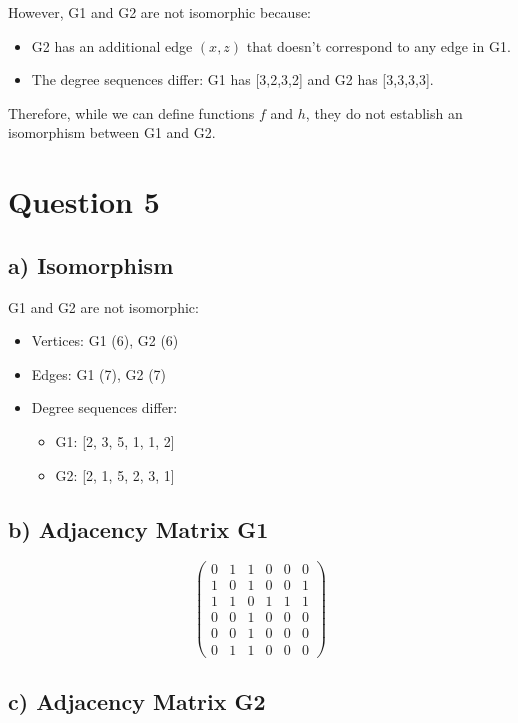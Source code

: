 \documentclass{article}
\begin{document}
However, G1 and G2 are not isomorphic because:
\begin{itemize}
\item G2 has an additional edge $(x,z)$ that doesn't correspond to any edge in G1.
\item The degree sequences differ: G1 has [3,2,3,2] and G2 has [3,3,3,3].
\end{itemize}

Therefore, while we can define functions $f$ and $h$, they do not establish an isomorphism between G1 and G2.

\section*{Question 5}

\subsection*{a) Isomorphism}

G1 and G2 are not isomorphic:
\begin{itemize}
  \item Vertices: G1 (6), G2 (6)
  \item Edges: G1 (7), G2 (7)
  \item Degree sequences differ:
    \begin{itemize}
      \item G1: [2, 3, 5, 1, 1, 2]
      \item G2: [2, 1, 5, 2, 3, 1]
    \end{itemize}
\end{itemize}

\subsection*{b) Adjacency Matrix G1}

\[
\begin{pmatrix}
0 & 1 & 1 & 0 & 0 & 0 \\
1 & 0 & 1 & 0 & 0 & 1 \\
1 & 1 & 0 & 1 & 1 & 1 \\
0 & 0 & 1 & 0 & 0 & 0 \\
0 & 0 & 1 & 0 & 0 & 0 \\
0 & 1 & 1 & 0 & 0 & 0
\end{pmatrix}
\]

\subsection*{c) Adjacency Matrix G2}
\end{document}
